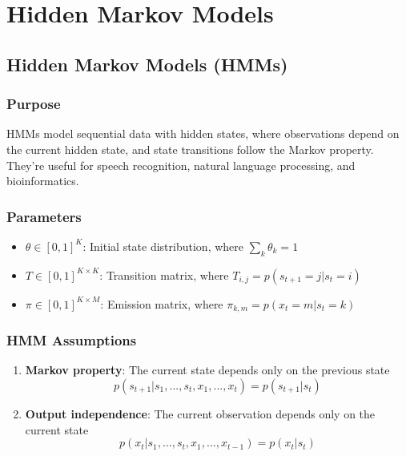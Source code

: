 \documentclass{article}
\begin{document}
\section{Hidden Markov Models}

\subsection{Hidden Markov Models (HMMs)}

\subsubsection{Purpose}
HMMs model sequential data with hidden states, where observations depend on the current hidden state, and state transitions follow the Markov property. They're useful for speech recognition, natural language processing, and bioinformatics.

\subsubsection{Parameters}
\begin{itemize}
    \item $\theta \in [0,1]^K$: Initial state distribution, where $\sum_k \theta_k = 1$
    \item $T \in [0,1]^{K \times K}$: Transition matrix, where $T_{i,j} = p(s_{t+1} = j | s_t = i)$
    \item $\pi \in [0,1]^{K \times M}$: Emission matrix, where $\pi_{k,m} = p(x_t = m | s_t = k)$
\end{itemize}

\subsubsection{HMM Assumptions}
\begin{enumerate}
    \item \textbf{Markov property}: The current state depends only on the previous state
    \begin{equation}
        p(s_{t+1}|s_1,...,s_t, x_1,...,x_t) = p(s_{t+1}|s_t)
    \end{equation}
    
    \item \textbf{Output independence}: The current observation depends only on the current state
    \begin{equation}
        p(x_t|s_1,...,s_t, x_1,...,x_{t-1}) = p(x_t|s_t)
    \end{equation}
\end{enumerate}
\end{document}
